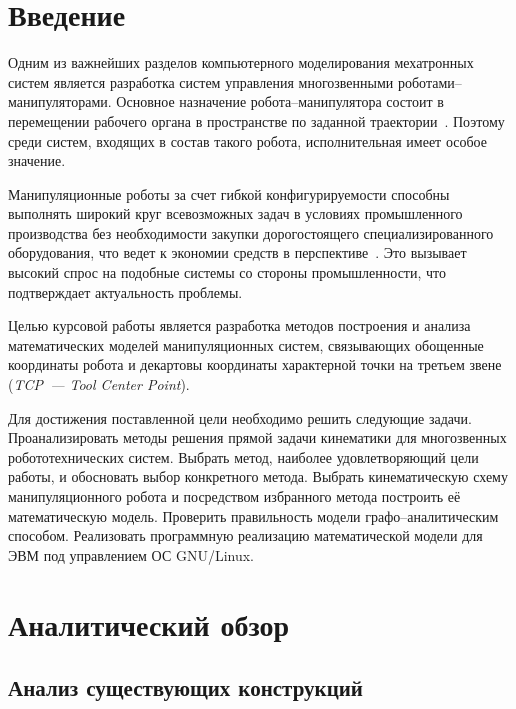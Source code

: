 \documentclass[oneside, final, 14pt]{extarticle}
\begin{document}
\newpage
\thispagestyle{empty}
\tableofcontents
\newpage

\section*{Введение}

Одним из важнейших разделов компьютерного моделирования мехатронных систем является разработка систем управления многозвенными роботами--манипуляторами.
Основное назначение робота--манипулятора состоит в перемещении рабочего органа в пространстве по заданной траектории~\cite{krahmalev:mod_rob}.
Поэтому среди систем, входящих в состав такого робота, исполнительная имеет особое значение.
\par
Манипуляционные роботы за счет гибкой конфигурируемости способны выполнять широкий круг всевозможных задач в условиях промышленного производства без необходимости закупки дорогостоящего специализированного оборудования, что ведет к экономии средств в перспективе~\cite{borisov:mod_rob}.
Это вызывает высокий спрос на подобные системы со стороны промышленности, что подтверждает актуальность проблемы.
\par
Целью курсовой работы является разработка методов построения и анализа математических моделей манипуляционных систем, связывающих обощенные координаты робота и декартовы координаты характерной точки на третьем звене ({\itshape TCP~--- Tool Center Point}).
\par
Для достижения поставленной цели необходимо решить следующие задачи.
Проанализировать методы решения прямой задачи кинематики для многозвенных робототехнических систем.
Выбрать метод, наиболее удовлетворяющий цели работы, и обосновать выбор конкретного метода.
Выбрать кинематическую схему манипуляционного робота и посредством избранного метода построить её математическую модель.
Проверить правильность модели графо--аналитическим способом.
Реализовать программную реализацию математической модели для ЭВМ под управлением ОС GNU/Linux.

\newpage

\section{Аналитический обзор}

\subsection{Анализ существующих конструкций}
\end{document}
